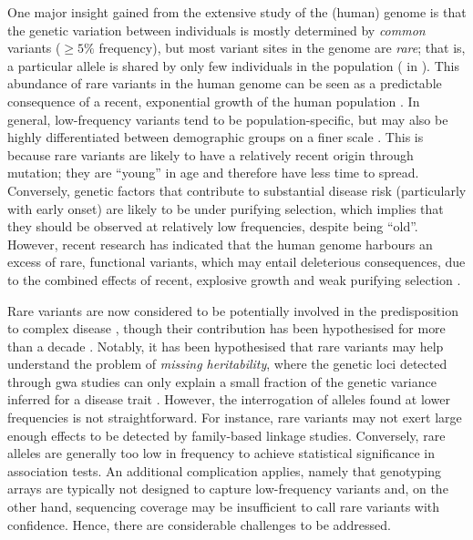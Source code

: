 One major insight gained from the extensive study of the (human) genome is that the genetic variation between individuals is mostly determined by \emph{common} variants (\eg ${\geq 5\%}$ frequency), but most variant sites in the genome are \emph{rare}; that is, a particular allele is shared by only few individuals in the population ( in ).
This abundance of rare variants in the human genome can be seen as a predictable consequence of a recent, exponential growth of the human population \citep{Fu:1995hp}.
In general, low-frequency variants tend to be population-specific, but may also be highly differentiated between demographic groups on a finer scale \citep{Gravel:2011bgb,Bustamante:2011df,Mathieson:2014ig}.
This is because rare variants are likely to have a relatively recent origin through mutation; \ie they are ``young'' in age and therefore have less time to spread.
Conversely, genetic factors that contribute to substantial disease risk (particularly with early onset) are likely to be under purifying selection, which implies that they should be observed at relatively low frequencies, \eg despite being ``old''.
However, recent research has indicated that the human genome harbours an excess of rare, functional variants, which may entail deleterious consequences, due to the combined effects of recent, explosive growth and weak purifying selection \citep[\eg, see][]{Kryukov:2007ec,Marth:2011bz, Coventry:2010cqa,Keinan:2012kl,Tennessen:2012ck}.


Rare variants are now considered to be potentially involved in the predisposition to complex disease \citep{Bodmer:2008ep,Schork:2009ke,McClellan:2010ksa,Cirulli:2010cza}, though their contribution has been hypothesised for more than a decade \citep{Pritchard:2001hw}.
Notably, it has been hypothesised that rare variants may help understand the problem of \emph{missing heritability}, where the genetic loci detected through \gls{gwa} studies
can only explain a small fraction of the genetic variance inferred for a disease trait \citep{Manolio:2009jp,Gibson:2012kca,Zuk:2014jv}.
However, the interrogation of alleles found at lower frequencies is not straightforward.
For instance, rare variants may not exert large enough effects to be detected by family-based linkage studies.
Conversely, rare alleles are generally too low in frequency to achieve statistical significance in association tests.
An additional complication applies, namely that genotyping arrays are typically not designed to capture low-frequency variants and, on the other hand, sequencing coverage may be insufficient to call rare variants with confidence.
Hence, there are considerable challenges to be addressed.


